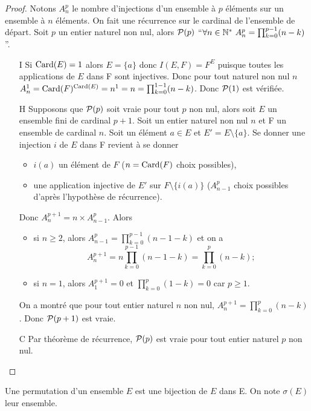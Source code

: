 \begin{proof}
  Notons \(A_n^p\) le nombre d'injections d'un ensemble à \(p\) éléments sur un ensemble à \(n\) éléments. On fait une récurrence sur le cardinal de l'ensemble de départ. Soit \(p\) un entier naturel non nul, alors \(\P(p)\) ``\(\forall n \in \N^* \ A_n^p=\prod_{k=0}^{p-1}(n-k)\)''. 
  \begin{itemize}
  \item[I] Si \(\Card(E)=1\) alors \(E=\{a\}\) donc \(I(E,F)=F^E\) puisque toutes les applications de \(E\) dans F sont injectives. Donc pour tout naturel non nul \(n\) \(A_n^1=\Card(F)^{\Card(E)}=n^1=n=\prod_{k=0}^{1-1}(n-k)\). Donc \(\P(1)\) est vérifiée.
  \item[H] Supposons que \(\P(p)\) soit vraie pour tout \(p\) non nul, alors soit \(E\) un ensemble fini de cardinal \(p+1\). Soit un entier naturel non nul \(n\) et F un ensemble de cardinal \(n\). Soit un élément \(a\in E\) et \(E'=E\setminus\{a\}\). Se donner une injection \(i\) de \(E\) dans F revient à se donner
    \begin{itemize}
    \item \(i(a)\) un élément de \(F\) (\(n=\Card(F)\) choix possibles),
    \item une application injective de \(E'\) sur \(F\setminus\{i(a)\}\) (\(A_{n-1}^p\) choix possibles d'après l'hypothèse de récurrence).
    \end{itemize}
    Donc \(A_{n}^{p+1}=n \times A_{n-1}^p\). Alors 
    \begin{itemize}
    \item si \(n\geqslant 2\), alors  \(A_{n-1}^p=\prod_{k=0}^{p-1}(n-1-k)\) et on a
      \begin{equation}
        A_{n}^{p+1}=n\prod_{k=0}^{p-1}(n-1-k)=\prod_{k=0}^{p}(n-k);
      \end{equation}
    \item si \(n=1\), alors \(A_{1}^{p+1}=0\) et \(\prod_{k=0}^{p}(1-k)=0\) car \(p\geqslant 1\).
    \end{itemize}
    On a montré que pour tout entier naturel \(n\) non nul, \(A_{n}^{p+1}=\prod_{k=0}^{p}(n-k)\). Donc \(\P(p+1)\) est vraie.
  \item[C] Par théorème de récurrence, \(\P(p)\) est vraie pour tout entier naturel \(p\) non nul.
  \end{itemize}
\end{proof}
\begin{defdef}
  Une permutation d'un ensemble \(E\) est une bijection de \(E\) dans E. On note \(\sigma(E)\) leur ensemble.
\end{defdef}

